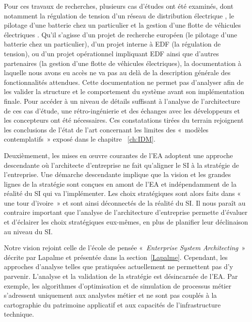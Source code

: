 Pour ces travaux de recherches, plusieurs cas d'études ont été examinés, dont
notamment la régulation de tension d'un réseau de distribution électrique
\cite{seghiri2014simulation}, le pilotage d'une batterie chez un particulier
\cite{seghiri2012animation} et la gestion d'une flotte de véhicules électriques
\cite{seghiri2015simulation}. Qu'il s'agisse d'un projet de recherche européen
(le pilotage d'une batterie chez un particulier), d'un projet interne à EDF (la
régulation de tension), ou d'un projet opérationnel impliquant EDF ainsi que
d'autres partenaires (la gestion d'une flotte de véhicules électriques), la
documentation à laquelle nous avons eu accès ne va pas au delà de la
description générale des fonctionnalités attendues. Cette documentation ne
permet pas d'analyser afin de les valider la structure et le comportement du
système avant son implémentation finale. Pour accéder à un niveau de détails
suffisant à l'analyse de l'architecture de ces cas d'étude, une
rétro-ingénierie et des échanges avec les développeurs et les concepteurs ont
été nécessaires. Ces constatations tirées du terrain rejoignent les conclusions
de l'état de l'art concernant les limites des «~modèles contemplatifs~» exposé
dans le chapitre ~\ref{ch:IDM}.

Deuxièmement, les mises en œuvre courantes de l'EA adoptent une approche
descendante où l'architecte d'entreprise ne fait qu'aligner le SI à la
stratégie de l'entreprise. Une démarche descendante implique que la vision et
les grandes lignes de la stratégie sont conçues en amont de l'EA et
indépendamment de la réalité du SI qui va l'implémenter. Les choix stratégiques
sont alors faits dans «~ une tour d'ivoire~» et sont ainsi déconnectés de la
réalité du SI. Il nous paraît au contraire important que l'analyse de
l'architecture d'entreprise permette d'évaluer et d'éclairer les choix
stratégiques eux-mêmes, en plus de planifier leur déclinaison au niveau du SI.

Notre vision rejoint celle de l'école de pensée «~\textit{Enterprise System
Architecting}~» décrite par Lapalme \cite{lapalme2012three} et présentée dans
la section~\ref{Lapalme}. Cependant, les approches d'analyse telles que
pratiquées actuellement ne permettent pas d'y parvenir. L'analyse et la
validation de la stratégie est désincarnée de l'EA. Par exemple,
les algorithmes d'optimisation et de simulation de processus métier s'adressent
uniquement aux analystes métier et ne sont pas couplés à la cartographie du
patrimoine applicatif et aux capacités de l'infrastructure technique.

